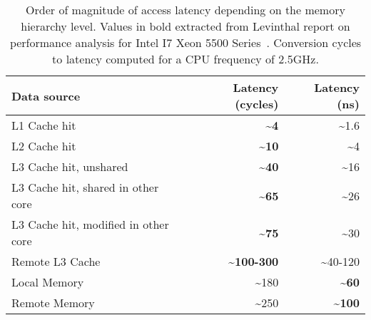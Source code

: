 \begin{table}[htb]
    \centering
    \begin{tabular}{lrr}
        \toprule
        \textbf{Data source} & \textbf{Latency (cycles)} & \textbf{Latency (ns)}\\
        \midrule
        L1 Cache hit                            & \textbf{\textasciitilde4}          & \textasciitilde1.6\\
        L2 Cache hit                            & \textbf{\textasciitilde10}         & \textasciitilde4\\
        \midrule
        L3 Cache hit, unshared                  & \textbf{\textasciitilde40}         & \textasciitilde16\\
        L3 Cache hit, shared in other core      & \textbf{\textasciitilde65}         & \textasciitilde26\\
        L3 Cache hit, modified in other core    & \textbf{\textasciitilde75}         & \textasciitilde30\\
        Remote L3 Cache                         & \textbf{\textasciitilde100-300}    & \textasciitilde40-120\\
        \midrule
        Local Memory                            & \textasciitilde180                 & \textbf{\textasciitilde60} \\
        Remote Memory                           & \textasciitilde250                 & \textbf{\textasciitilde100} \\
        \bottomrule
    \end{tabular}
    \caption[Approximate access latency depending on the memory hierarchy level.]{Order of magnitude of access latency depending on the memory hierarchy level.
    Values in bold extracted from Levinthal report on performance analysis for \gls{Intel} I7 Xeon 5500 Series~\cite{Levinthal09Performance}.
    Conversion cycles to latency computed for a CPU frequency of 2.5GHz.
}
\label{tab:mem-latency}
\end{table}

